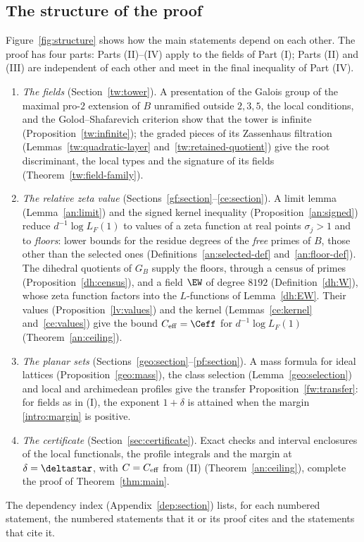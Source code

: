 \subsection{The structure of the proof}\label{intro:structure}
Figure~\ref{fig:structure} shows how the main statements depend on each
other. The proof has four parts: Parts (II)--(IV) apply to the fields of
Part (I); Parts (II) and (III) are independent of each other and meet in
the final inequality of Part (IV).
\begin{enumerate}
\item[(I)] \emph{The fields} (Section~\ref{tw:tower}). A presentation of the
 Galois group of the maximal pro-$2$ extension of $B$ unramified outside
 $2,3,5$, the local conditions, and the Golod--Shafarevich criterion show
 that the tower is infinite (Proposition~\ref{tw:infinite}); the graded
 pieces of its Zassenhaus filtration (Lemmas~\ref{tw:quadratic-layer}
 and~\ref{tw:retained-quotient}) give the root discriminant, the local
 types and the signature of its fields (Theorem~\ref{tw:field-family}).
\item[(II)] \emph{The relative zeta value} (Sections~\ref{gf:section}--\ref{ce:section}).
 A limit lemma (Lemma~\ref{an:limit}) and the signed kernel inequality
 (Proposition~\ref{an:signed}) reduce $d^{-1}\log L_F(1)$ to values of a zeta
 function at real points $\sigma_j>1$ and to \emph{floors}: lower bounds for
 the residue degrees of the \emph{free} primes of $B$, those other than the
 selected ones (Definitions~\ref{an:selected-def} and~\ref{an:floor-def}). The
 dihedral quotients of $G_B$ supply the floors, through a census of primes
 (Proposition~\ref{dh:census}), and a field $\EW$ of degree $8192$
 (Definition~\ref{dh:W}), whose zeta function factors into the
 $L$-functions of Lemma~\ref{dh:EW}. Their values
 (Proposition~\ref{lv:values}) and the kernel (Lemmas~\ref{ce:kernel}
 and~\ref{ce:values}) give the bound $C_{\rm eff}=\Ceff$ for
 $d^{-1}\log L_F(1)$ (Theorem~\ref{an:ceiling}).
\item[(III)] \emph{The planar sets} (Sections~\ref{geo:section}--\ref{pf:section}).
 A mass formula for ideal lattices (Proposition~\ref{geo:mass}), the class
 selection (Lemma~\ref{geo:selection}) and local and archimedean profiles
 give the transfer Proposition~\ref{fw:transfer}: for fields as in (I), the
 exponent $1+\delta$ is attained when the margin \eqref{intro:margin} is
 positive.
\item[(IV)] \emph{The certificate} (Section~\ref{sec:certificate}). Exact
 checks and interval enclosures of the local functionals, the profile
 integrals and the margin at $\delta=\deltastar$, with $C=C_{\rm eff}$ from
 (II) (Theorem~\ref{an:ceiling}), complete the proof of Theorem~\ref{thm:main}.
\end{enumerate}
The dependency index (Appendix~\ref{dep:section}) lists, for each numbered
statement, the numbered statements that it or its proof cites and the
statements that cite it.

